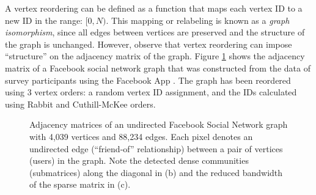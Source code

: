 \par A vertex reordering can be defined as a function that maps each vertex ID to a new ID in the range: $[0, N)$. This mapping or relabeling is known as a \textit{graph isomorphism}, since all edges between vertices are preserved and the structure of the graph is unchanged. However, observe that vertex reordering can impose ``structure'' on the adjacency matrix of the graph. Figure \ref{fig:fb_adjmats} shows the adjacency matrix of a Facebook social network graph that was constructed from the data of survey participants using the Facebook App \cite{leskovec2012learning}. The graph has been reordered using 3 vertex orders: a random vertex ID assignment, and the IDs calculated using Rabbit and Cuthill-McKee orders. 

\begin{figure}[!htp]

  \centering
  \hfil   
  \hfil
  \caption{Adjacency matrices of an undirected Facebook Social Network graph with 4,039 vertices and 88,234 edges. Each pixel denotes an undirected edge (``friend-of'' relationship) between a pair of vertices (users) in the graph. Note the detected dense communities (submatrices) along the diagonal in (b) and the reduced bandwidth of the sparse matrix in (c). }\label{fig:fb_adjmats}
  \end{figure}

